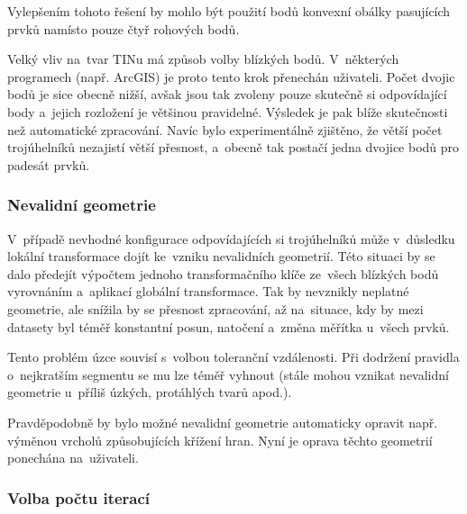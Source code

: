Vylepšením tohoto řešení by mohlo být použití bodů konvexní obálky pasujících
prvků namísto pouze čtyř rohových bodů.

Velký vliv na~tvar TINu má způsob volby blízkých bodů. V~některých programech
(např. ArcGIS) je proto tento krok přenechán uživateli. Počet dvojic bodů je
sice obecně nižší, avšak jsou tak zvoleny pouze skutečně si odpovídající body
a~jejich rozložení je většinou pravidelné. Výsledek je pak blíže skutečnosti
než automatické zpracování. Navíc bylo experimentálně zjištěno, že větší počet
trojúhelníků nezajistí větší přesnost, a~obecně tak postačí jedna dvojice
bodů pro padesát prvků. %

\subsubsection{Nevalidní geometrie}

V~případě nevhodné konfigurace odpovídajících si trojúhelníků může v~důsledku
lokální transformace dojít ke~vzniku nevalidních geometrií. Této situaci by se
dalo předejít výpočtem jednoho transformačního klíče ze~všech blízkých bodů
vyrovnáním a~aplikací globální transformace. Tak by nevznikly neplatné geometrie,
ale snížila by se přesnost zpracování, až na~situace, kdy by mezi datasety byl
téměř konstantní posun, natočení a~změna měřítka u~všech prvků.


Tento problém úzce souvisí s~volbou toleranční vzdálenosti. Při dodržení pravidla
o~nejkratším segmentu  se mu lze téměř vyhnout (stále mohou vznikat nevalidní 
geometrie u~příliš úzkých, protáhlých tvarů apod.). 

Pravděpodobně by bylo možné nevalidní geometrie automaticky opravit např. výměnou
vrcholů způsobujících křížení hran. Nyní je oprava těchto geometrií ponechána 
na~uživateli.

\subsubsection{Volba počtu iterací}

